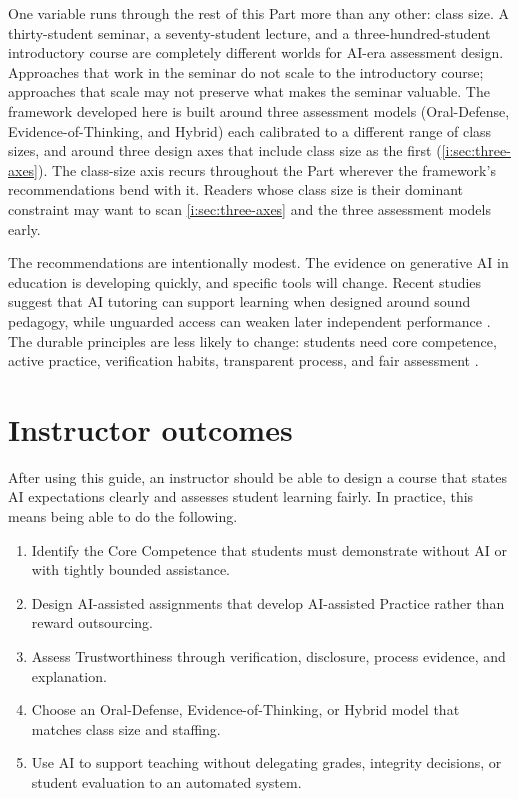 \documentclass{SIAMbook2023}
\begin{document}
One variable runs through the rest of this Part more than any other: class size. A thirty-student seminar, a seventy-student lecture, and a three-hundred-student introductory course are completely different worlds for AI-era assessment design. Approaches that work in the seminar do not scale to the introductory course; approaches that scale may not preserve what makes the seminar valuable. The framework developed here is built around three assessment models (Oral-Defense, Evidence-of-Thinking, and Hybrid) each calibrated to a different range of class sizes, and around three design axes that include class size as the first (\cref{i:sec:three-axes}). The class-size axis recurs throughout the Part wherever the framework's recommendations bend with it. Readers whose class size is their dominant constraint may want to scan \cref{i:sec:three-axes} and the three assessment models early.

The recommendations are intentionally modest. The evidence on generative AI in education is developing quickly, and specific tools will change. Recent studies suggest that AI tutoring can support learning when designed around sound pedagogy, while unguarded access can weaken later independent performance \citep{bastani2025generative,kestin2025ai}. The durable principles are less likely to change: students need core competence, active practice, verification habits, transparent process, and fair assessment \citep{oecd2026digital,dunlosky2013improving}.

\section{Instructor outcomes}
\label{i:sec:instructor-outcomes}%

After using this guide, an instructor should be able to design a course that states AI expectations clearly and assesses student learning fairly. In practice, this means being able to do the following.

\begin{enumerate}
  \item Identify the Core Competence that students must demonstrate without AI or with tightly bounded assistance.
  \item Design AI-assisted assignments that develop AI-assisted Practice rather than reward outsourcing.
  \item Assess Trustworthiness through verification, disclosure, process evidence, and explanation.
  \item Choose an Oral-Defense, Evidence-of-Thinking, or Hybrid model that matches class size and staffing.
  \item Use AI to support teaching without delegating grades, integrity decisions, or student evaluation to an automated system.
\end{enumerate}
\end{document}
